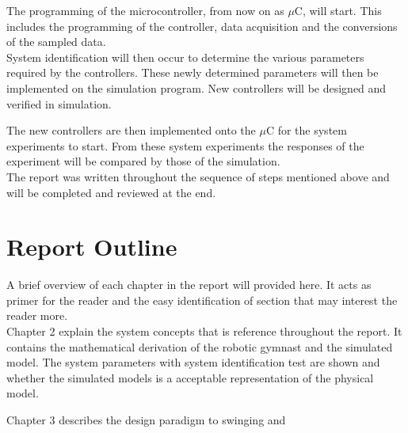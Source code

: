 The programming of the microcontroller, from now on as $\mu$C, will start. This includes the programming of the controller, data acquisition and the conversions of the sampled data.\\

System identification will then occur to determine the various parameters required by the controllers. These newly determined parameters will then be implemented on the simulation program. New controllers will be designed and verified in simulation.

The new controllers are then implemented onto the $\mu$C for the system experiments to start. From these system experiments the responses of the experiment will be compared by those of the simulation.\\

The report was written throughout the sequence of steps mentioned above and will be completed and reviewed at the end.


\section{Report Outline}

A brief overview of each chapter in the report will provided here. It acts as primer for the reader and the easy identification of section that may interest the reader more.\\

Chapter 2 explain the system concepts that is reference throughout the report. It contains the mathematical derivation of the robotic gymnast and the simulated model. The system parameters with system identification test are shown and whether the simulated models is a acceptable representation of the physical model.

Chapter 3 describes the design paradigm to swinging and 
 
